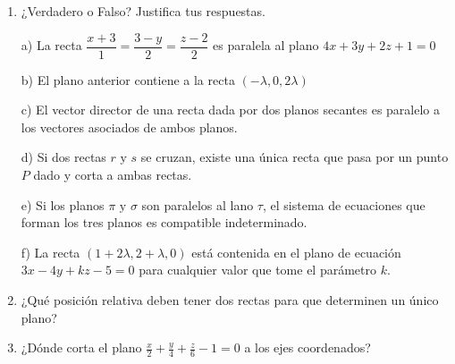 \begin{enumerate}[Q1. ]
\item ¿Verdadero o Falso? Justifica tus respuestas.

a) La recta $\dfrac{x+3}{1}=\dfrac    {3-y}{2}=\dfrac{z-2}{2}$ es paralela al plano $4x+3y+2z+1=0$

b) El plano anterior contiene a la recta $(-\lambda,0,2\lambda)$

c) El vector director de una recta dada por dos planos secantes es paralelo a los vectores asociados de ambos planos.

d) Si dos rectas $r \text{ y } s$ se cruzan, existe una única recta que pasa por un punto $P$ dado y corta a ambas rectas.

e) Si los planos $\pi \text{ y } \sigma$ son paralelos al lano $\tau$, el sistema de ecuaciones que forman los tres planos es compatible indeterminado.

f) La recta $(1+2\lambda, 2+\lambda, 0)$ está contenida en el plano de ecuación $3x-4y+kz-5=0$ para cualquier valor que tome el parámetro $k$.

\hspace{-10mm}

\hspace{-10mm}

\hspace{-10mm}

\item ¿Qué posición relativa deben tener dos rectas para que determinen un único plano?

\hspace{-10mm}

\item ¿Dónde corta el plano $\frac x 2 + \frac y 4 + \frac z 6 -1=0$ a los ejes coordenados?

\hspace{-10mm}


\end{enumerate}
